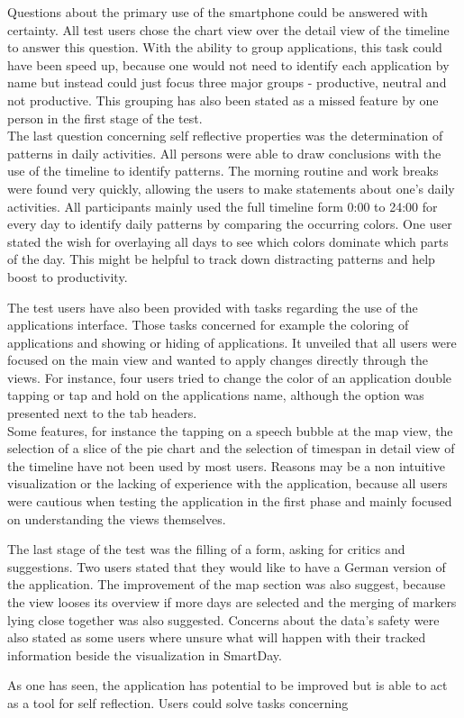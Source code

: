 Questions  about the primary use of the smartphone could be answered with certainty. All test users chose the chart view over the detail view of the timeline to answer this question. With the ability to group applications, this task could have been speed up, because one would not need to identify each application by name but instead could just focus three major groups - productive, neutral and not productive. This grouping has also been stated as a missed feature by one person in the first stage of the test.\\
The last question concerning self reflective properties was the determination of patterns in daily activities. All persons were able to draw conclusions with the use of the timeline to identify patterns. The morning routine and work breaks were found very quickly, allowing the users to make statements about one's daily activities. All participants mainly used the full timeline form 0:00 to 24:00 for every day to identify daily patterns by comparing the occurring colors. One user stated the wish for overlaying all days to see which colors dominate which parts of the day. This might be helpful to track down distracting patterns and help boost to productivity.

The  test users have also been provided with tasks regarding the use of the applications interface. Those tasks concerned for example the coloring of applications and showing or hiding of applications. It unveiled that all users were focused on the main view and wanted to apply changes directly through the views. For instance, four users tried to change the color of an application double tapping or tap and hold on the applications name, although the option was presented next to the tab headers.\\
Some features, for instance the tapping on a speech bubble at the map view, the selection of a slice of the pie chart and the selection of timespan in detail view of the timeline have not been used by most users. Reasons may be a non intuitive visualization or the lacking of experience with the application, because all users were cautious when testing the application in the first phase and mainly focused on understanding the views themselves.

The  last stage of the test was the filling of a form, asking for critics and suggestions. Two users stated that they would like to have a German version of the application. The improvement of the map section was also suggest, because the view looses its overview if more days are selected and the merging of markers lying close together was also suggested. Concerns about the data's safety were also stated as some users where unsure what will happen with their tracked information beside the visualization in SmartDay.

As one has seen, the application has potential to be improved but is able to act as a tool for self reflection. Users could solve tasks concerning 
